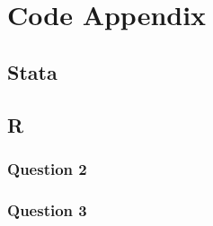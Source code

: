 \documentclass[12pt]{article}
\begin{document}
\newpage
\section{Code Appendix}
\tiny
\subsection*{Stata}

\subsection*{R}
\subsubsection*{Question 2}

\subsubsection*{Question 3}

\end{document}
